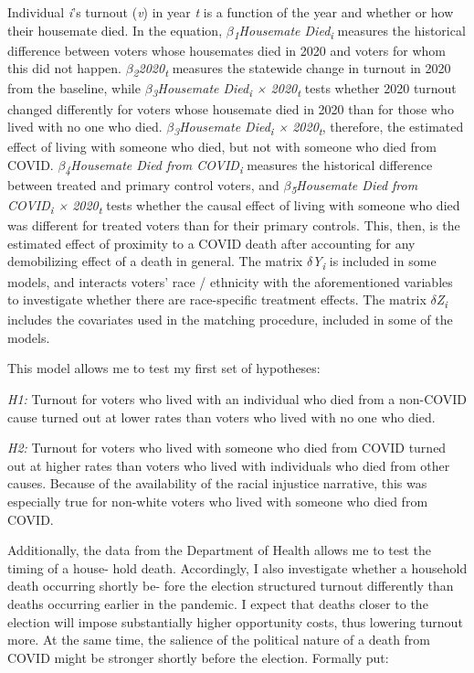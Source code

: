 \documentclass[
  12pt,
]{article}
\begin{document}
Individual \emph{i}'s turnout (\emph{v}) in year \emph{t} is a function of the year and whether or how their housemate died. In the equation, \emph{\(\beta\)\textsubscript{1}Housemate Died\textsubscript{i}} measures the historical difference between voters whose housemates died in 2020 and voters for whom this did not happen. \emph{\(\beta\)\textsubscript{2}2020\textsubscript{t}} measures the statewide change in turnout in 2020 from the baseline, while \emph{\(\beta\)\textsubscript{3}Housemate Died\textsubscript{i} × 2020\textsubscript{t}} tests whether 2020 turnout changed differently for voters whose housemate died in 2020 than for those who lived with no one who died. \emph{\(\beta\)\textsubscript{3}Housemate Died\textsubscript{i} × 2020\textsubscript{t}}, therefore, the estimated effect of living with someone who died, but not with someone who died from COVID. \emph{\(\beta\)\textsubscript{4}Housemate Died from COVID\textsubscript{i}} measures the historical difference between treated and primary control voters, and \emph{\(\beta\)\textsubscript{5}Housemate Died from COVID\textsubscript{i} × 2020\textsubscript{t}} tests whether the causal effect of living with someone who died was different for treated voters than for their primary controls. This, then, is the estimated effect of proximity to a COVID death after accounting for any demobilizing effect of a death in general. The matrix \emph{\(\delta\)Y\textsubscript{i}} is included in some models, and interacts voters' race / ethnicity with the aforementioned variables to investigate whether there are race-specific treatment effects. The matrix \emph{\(\delta\)Z\textsubscript{i}} includes the covariates used in the matching procedure, included in some of the models.

This model allows me to test my first set of hypotheses:

\emph{H1:} Turnout for voters who lived with an individual who died from a non-COVID cause turned out at lower rates than voters who lived with no one who died.

\emph{H2:} Turnout for voters who lived with someone who died from COVID turned out at higher rates than voters who lived with individuals who died from other causes. Because of the availability of the racial injustice narrative, this was especially true for non-white voters who lived with someone who died from COVID.

Additionally, the data from the Department of Health allows me to test the timing of a house- hold death. Accordingly, I also investigate whether a household death occurring shortly be- fore the election structured turnout differently than deaths occurring earlier in the pandemic. I expect that deaths closer to the election will impose substantially higher opportunity costs, thus lowering turnout more. At the same time, the salience of the political nature of a death from COVID might be stronger shortly before the election. Formally put:
\end{document}
